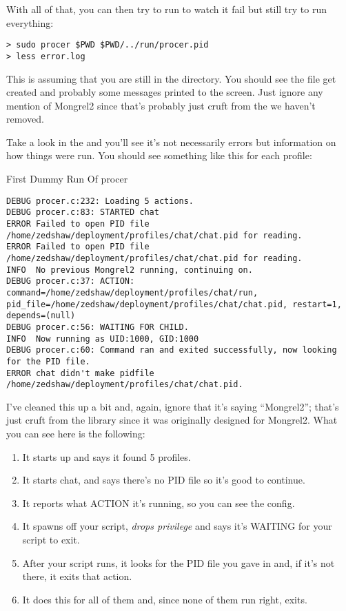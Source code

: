 With all of that, you can then try to run  to watch
it fail but still try to run everything:

\begin{lstlisting}
> sudo procer $PWD $PWD/../run/procer.pid
> less error.log
\end{lstlisting}

This is assuming that you are still in the  directory.
You should see the file  get created and
probably some messages printed to the screen.  Just ignore any
mention of Mongrel2 since that's probably just cruft from the 
we haven't removed.

Take a look in the  and you'll see it's not necessarily
errors but information on how things were run.  You should
see something like this for each profile:

\begin{code}{First Dummy Run Of procer}
\begin{lstlisting}
DEBUG procer.c:232: Loading 5 actions.
DEBUG procer.c:83: STARTED chat
ERROR Failed to open PID file /home/zedshaw/deployment/profiles/chat/chat.pid for reading.
ERROR Failed to open PID file /home/zedshaw/deployment/profiles/chat/chat.pid for reading.
INFO  No previous Mongrel2 running, continuing on.
DEBUG procer.c:37: ACTION: command=/home/zedshaw/deployment/profiles/chat/run, pid_file=/home/zedshaw/deployment/profiles/chat/chat.pid, restart=1, depends=(null)
DEBUG procer.c:56: WAITING FOR CHILD.
INFO  Now running as UID:1000, GID:1000
DEBUG procer.c:60: Command ran and exited successfully, now looking for the PID file.
ERROR chat didn't make pidfile /home/zedshaw/deployment/profiles/chat/chat.pid.
\end{lstlisting}
\end{code}

I've cleaned this up a bit and, again, ignore that it's saying ``Mongrel2'';
that's just cruft from the library since it was originally designed
for Mongrel2.  What you can see here is the following:

\begin{enumerate}
\item It starts up and says it found 5 profiles.
\item It starts chat, and says there's no PID file so it's good to continue.
\item It reports what ACTION it's running, so you can see the config.
\item It spawns off your  script, \emph{drops privilege}
     and says it's WAITING for your script to exit.
\item After your script runs, it looks for the PID file you gave in  and, if it's not there, it exits that action.
\item It does this for all of them and, since none of them run right,  exits.
\end{enumerate}

